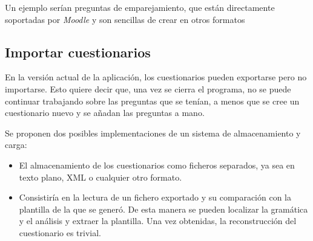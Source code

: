 Un ejemplo serían preguntas de emparejamiento, que están directamente soportadas por \textit{Moodle} y son sencillas de crear en otros formatos

  
 \subsection{Importar cuestionarios} 
En la versión actual de la aplicación, los cuestionarios pueden exportarse pero no importarse. Esto quiere decir que, una vez se cierra el programa, no se puede continuar trabajando sobre las preguntas que se tenían, a menos que se cree un cuestionario nuevo y se añadan las preguntas a mano. 

Se proponen dos posibles implementaciones de un sistema de almacenamiento y carga:

 \begin{itemize}
 \item El almacenamiento de los cuestionarios como ficheros separados, ya sea en texto plano, XML o cualquier otro formato.
 \item Consistiría en la lectura de un fichero exportado y su comparación con la plantilla de la que se generó. De esta manera se pueden localizar la gramática y el análisis y extraer la plantilla. Una vez obtenidas, la reconstrucción del cuestionario es trivial.
 \end{itemize}
